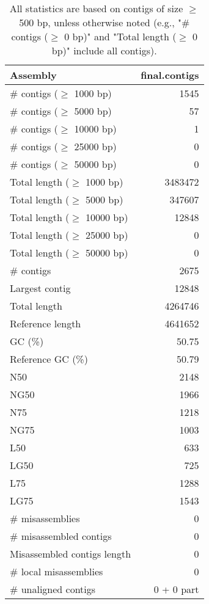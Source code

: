 \documentclass[12pt,a4paper]{article}
\begin{document}
\begin{table}[ht]
\begin{center}
\caption{All statistics are based on contigs of size $\geq$ 500 bp, unless otherwise noted (e.g., "\# contigs ($\geq$ 0 bp)" and "Total length ($\geq$ 0 bp)" include all contigs).}
\begin{tabular}{|l*{1}{|r}|}
\hline
Assembly & final.contigs \\ \hline
\# contigs ($\geq$ 1000 bp) & 1545 \\ \hline
\# contigs ($\geq$ 5000 bp) & 57 \\ \hline
\# contigs ($\geq$ 10000 bp) & 1 \\ \hline
\# contigs ($\geq$ 25000 bp) & 0 \\ \hline
\# contigs ($\geq$ 50000 bp) & 0 \\ \hline
Total length ($\geq$ 1000 bp) & 3483472 \\ \hline
Total length ($\geq$ 5000 bp) & 347607 \\ \hline
Total length ($\geq$ 10000 bp) & 12848 \\ \hline
Total length ($\geq$ 25000 bp) & 0 \\ \hline
Total length ($\geq$ 50000 bp) & 0 \\ \hline
\# contigs & 2675 \\ \hline
Largest contig & 12848 \\ \hline
Total length & 4264746 \\ \hline
Reference length & 4641652 \\ \hline
GC (\%) & 50.75 \\ \hline
Reference GC (\%) & 50.79 \\ \hline
N50 & 2148 \\ \hline
NG50 & 1966 \\ \hline
N75 & 1218 \\ \hline
NG75 & 1003 \\ \hline
L50 & 633 \\ \hline
LG50 & 725 \\ \hline
L75 & 1288 \\ \hline
LG75 & 1543 \\ \hline
\# misassemblies & 0 \\ \hline
\# misassembled contigs & 0 \\ \hline
Misassembled contigs length & 0 \\ \hline
\# local misassemblies & 0 \\ \hline
\# unaligned contigs & 0 + 0 part \\ \hline

\end{tabular}
\end{center}
\end{table}
\end{document}

